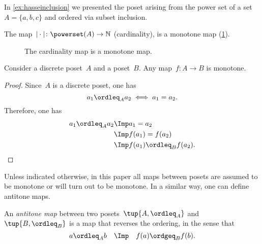 \begin{example}
In \cref{ex:hasseinclusion} we presented the poset arising from the power set of a set~$A=\{a,b,c\}$ and ordered via subset inclusion.

The map~$\vert \cdot \vert \colon \powerset(A)\to \mathbb{N}$ (cardinality), is a monotone map (\cref{fig:cardinality}).
\begin{figure}[h!]
\begin{center}
\end{center}
\caption{The cardinality map is a monotone map. \label{fig:cardinality}}
\end{figure}
\end{example}

\begin{lemma}
Consider a discrete poset~$A$ and a poset~$B$. Any map~$f\colon A\to B$ is monotone.
\end{lemma}
\begin{proof}
Since~$A$ is a discrete poset, one has
\begin{equation}
    a_1\ordleq_A a_2 \iff a_1=a_2.
\end{equation}
Therefore, one has
\begin{equation}
\begin{aligned}
    a_1\ordleq_A a_2 &\Imp a_1=a_2\\
    &\Imp f(a_1)=f(a_2)\\
    &\Imp f(a_1)\ordleq_B f(a_2).
\end{aligned}
\end{equation}
\end{proof}
Unless indicated otherwise, in this paper all maps between posets are assumed to be monotone or will turn out to be monotone. In a similar way, one can define antitone maps.
\begin{definition}
An \emph{antitone map} between two posets~$\tup{A, \ordleq_A}$ and~$\tup{B, \ordleq_B}$ is a map that reverses the ordering, in the sense that
\begin{equation}
 a \ordleq_A b \quad \Imp \quad f(a) \ordgeq_B f(b).
\end{equation}
\end{definition}

